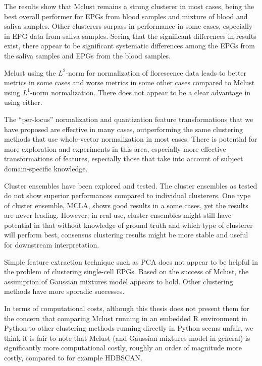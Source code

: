 The results show that Mclust remains a strong clusterer in most cases, being the best overall performer for EPGs from blood samples and mixture of blood and saliva samples. Other clusterers surpass in performance in some cases, especially in EPG data from saliva samples. Seeing that the significant differences in results exist, there appear to be significant systematic differences among the EPGs from the saliva samples and EPGs from the blood samples.

Mclust using the $L^{2}$-norm for normalization of florescence data leads to better metrics in some cases and worse metrics in some other cases compared to Mclust using $L^{1}$-norm normalization. There does not appear to be a clear advantage in using either.

The ``per-locus'' normalization and quantization feature transformations that we have proposed are effective in many cases, outperforming the same clustering methods that use whole-vector normalization in most cases. There is potential for more exploration and experiments in this area, especially more effective transformations of features, especially those that take into account of subject domain-specific knowledge.

Cluster ensembles have been explored and tested. The cluster ensembles as tested do not show superior performances compared to individual clusterers. One type of cluster ensemble, MCLA, shows good results in a some cases, yet the results are never leading. However, in real use, cluster ensembles might still have potential in that without knowledge of ground truth and which type of clusterer will perform best, consensus clustering results might be more stable and useful for downstream interpretation.

Simple feature extraction technique such as PCA does not appear to be helpful in the problem of clustering single-cell EPGs. Based on the success of Mclust, the assumption of Gaussian mixtures model appears to hold. Other clustering methods have more sporadic successes.

In terms of computational costs, although this thesis does not present them for the concern that comparing Mclust running in an embedded R environment in Python to other clustering methods running directly in Python seems unfair, we think it is fair to note that Mclust (and Gaussian mixtures model in general) is significantly more computational costly, roughly an order of magnitude more costly, compared to for example HDBSCAN.


